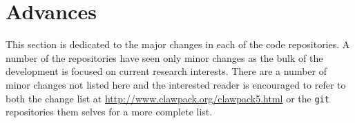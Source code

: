 %
%
%

\section{Advances} \label{sec:advances}

This section is dedicated to the major changes in each of the code repositories.
A number of the repositories have seen only minor changes as the bulk of the
development is focused on current research interests.  There are a number of
minor changes not listed here and the interested reader is encouraged to refer
to both the change list at \url{http://www.clawpack.org/clawpack5.html} or the
\texttt{git} repositories them selves for a more complete list.








